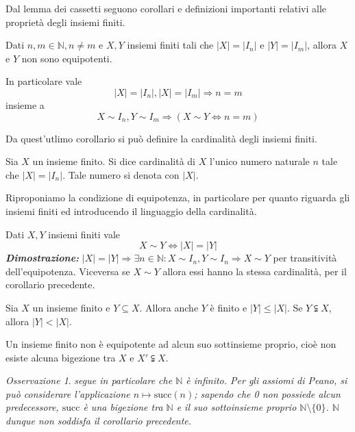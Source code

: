 \documentclass[oneside]{book}
\theoremstyle{remark}
\newtheorem*{osservaz}{Osservazione}
\begin{document}
Dal lemma dei cassetti seguono corollari e definizioni importanti
relativi alle proprietà degli insiemi finiti.
\begin{tcolorbox}[colback=green!30, colframe=green!30!black, title={Equipotenza tra insiemi finiti}]
Dati $n,m\in\mathbb{N}, n\not=m$ e $X,Y$ insiemi finiti tali che $|X|=|I_n|$ e $|Y|=|I_m|$,
allora $X$ e $Y$ non sono equipotenti.

In particolare vale \[ |X|=|I_n|,|X|=|I_m| \Longrightarrow n=m \]
insieme a \[ X\sim I_n,Y\sim I_m \Longrightarrow (X\sim Y \Leftrightarrow n = m) \]
\end{tcolorbox}
Da quest'utlimo corollario si può definire la cardinalità degli insiemi
finiti.

\begin{tcolorbox}[colback=yellow!30, colframe=yellow!30!black, title={Cardinalità di un insieme finito}]
Sia $X$ un insieme finito. Si dice cardinalità di $X$ l'unico numero
naturale $n$ tale che $|X|=|I_n|$. Tale numero si denota con $|X|$.
\end{tcolorbox}

Riproponiamo la condizione di equipotenza, in particolare per quanto
riguarda gli insiemi finiti ed introducendo il linguaggio della cardinalità.

\begin{tcolorbox}[title={Condizione di equipotenza espressa in termini di cardinalità}]
Dati $X,Y$ insiemi finiti vale
\[ X\sim Y \Longleftrightarrow |X|=|Y| \]
\textit{\textbf{Dimostrazione:}} $|X|=|Y|\Longrightarrow \exists n\in\mathbb{N}:
X\sim I_n, Y\sim I_n\Longrightarrow X\sim Y$ per transitività dell'equipotenza.
Viceversa se $X\sim Y$ allora essi hanno la stessa cardinalità, per il
corollario precedente.
\end{tcolorbox}

\begin{tcolorbox}[title={Cardinalità di sottoinsiemi finiti}]
Sia $X$ un insieme finito e $Y\subseteq X$. Allora anche
$Y$ è finito e $|Y|\leq|X|$. Se $Y\subsetneqq X$, allora
$|Y|<|X|$.
\end{tcolorbox}

\begin{tcolorbox}[colback=green!30, colframe=green!30!black, title={Equipotenza tra insieme finito e sottoinsieme}]
Un insieme finito non è equipotente ad alcun suo sottinsieme proprio,
cioè non esiste alcuna bigezione tra $X$ e $X'\subsetneqq X$.
\end{tcolorbox}

\begin{osservaz}
\emph{segue in particolare che $\mathbb{N}$ è
infinito. Per gli assiomi di Peano, si può considerare
l'applicazione $n\mapsto \text{succ}(n)$; sapendo che 0 non
possiede alcun predecessore, $\text{succ}$ è una bigezione
tra $\mathbb{N}$ e il suo sottoinsieme proprio $\mathbb{N}\setminus\{0\}$.
$\mathbb{N}$ dunque non soddisfa il corollario precedente.}
\end{osservaz}
\end{document}
